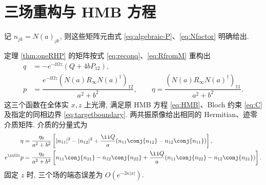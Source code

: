 \section{三场重构与 HMB 方程}
记 $n_{jk}=N(a)_{jk}$, 则这些矩阵元由式 \eqref{eq:algebraic-P}、\eqref{eq:Nfactor} 明确给出.

\begin{theorem}[一轨道逆重构与方程相容性]\label{thm:direct-HMB}\label{prop:oneboundary}
定理 \ref{thm:oneRHP} 的矩阵按式 \eqref{eq:reconq}、\eqref{eq:RfromM} 重构出
\begin{equation}\label{eq:finalfields}
\begin{aligned}
q&=-e^{-\ii\Omega z}(Q+4bP_{12}),\\
p&=\dfrac{e^{-\ii\Omega z}(N(a)R_\infty N(a)^\dagger)_{12}}{a^2+b^2},\qquad
\eta=\dfrac{(N(a)R_\infty N(a)^\dagger)_{11}}{a^2+b^2}.
\end{aligned}
\end{equation}
这三个函数在全体实 $x,z$ 上光滑, 满足原 HMB 方程 \eqref{eq:HMB}、Bloch 约束 \eqref{eq:C} 及指定的同相边界 \eqref{eq:targetboundary}. 两共振原像给出相同的 Hermitian、迹零介质矩阵. 介质的分量式为
\begin{align}
\eta&=\dfrac{\eta_0}{a^2+b^2}\left[|n_{11}|^2-|n_{12}|^2
+\dfrac{\ii Q}{a}(n_{11}\conj{n_{12}}-n_{12}\conj{n_{11}})\right],\label{eq:etacomponent}\\
e^{\ii\Omega z}p&=\dfrac{\eta_0}{a^2+b^2}\left[n_{11}\conj{n_{21}}-n_{12}\conj{n_{22}}
+\dfrac{\ii Q}{a}(n_{11}\conj{n_{22}}-n_{12}\conj{n_{21}})\right].\label{eq:pcomponent}
\end{align}
固定 $z$ 时, 三个场的端态误差为 $O(e^{-2\kappa|x|})$.
\end{theorem}

